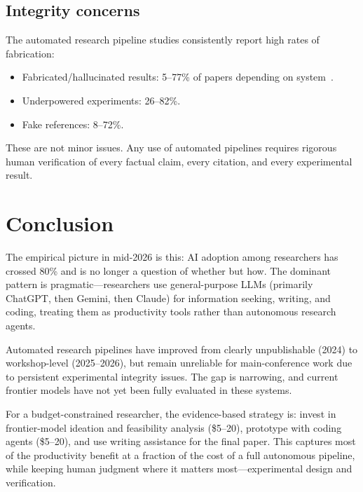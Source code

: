 \documentclass[11pt,a4paper]{article}
\begin{document}
\subsection{Integrity concerns}

The automated research pipeline studies consistently report high rates of fabrication:
\begin{itemize}
\item Fabricated/hallucinated results: 5--77\% of papers depending on system~\cite{scholarpeer2026}.
\item Underpowered experiments: 26--82\%.
\item Fake references: 8--72\%.
\end{itemize}

These are not minor issues. Any use of automated pipelines requires rigorous human verification of every factual claim, every citation, and every experimental result.


\section{Conclusion}
\label{sec:conclusion}

The empirical picture in mid-2026 is this: AI adoption among researchers has crossed 80\% and is no longer a question of whether but how. The dominant pattern is pragmatic---researchers use general-purpose LLMs (primarily ChatGPT, then Gemini, then Claude) for information seeking, writing, and coding, treating them as productivity tools rather than autonomous research agents.

Automated research pipelines have improved from clearly unpublishable (2024) to workshop-level (2025--2026), but remain unreliable for main-conference work due to persistent experimental integrity issues. The gap is narrowing, and current frontier models have not yet been fully evaluated in these systems.

For a budget-constrained researcher, the evidence-based strategy is: invest in frontier-model ideation and feasibility analysis (\$5--20), prototype with coding agents (\$5--20), and use writing assistance for the final paper. This captures most of the productivity benefit at a fraction of the cost of a full autonomous pipeline, while keeping human judgment where it matters most---experimental design and verification.

\newpage
\end{document}
